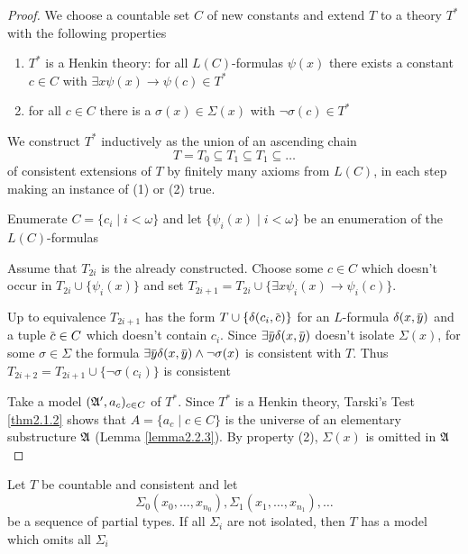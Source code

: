 \documentclass[11pt]{article}
\begin{document}
\begin{proof}
We choose a countable set \(C\) of new constants and extend \(T\) to a theory
\(T^*\) with the following properties
\begin{enumerate}
\item \(T^*\) is a Henkin theory: for all \(L(C)\)-formulas \(\psi(x)\) there
exists a constant \(c\in C\) with \(\exists x\psi(x)\to\psi(c)\in T^*\)
\item for all \(c\in C\) there is a \(\sigma(x)\in\Sigma(x)\) with \(\neg\sigma(c)\in
      T^*\)
\end{enumerate}


We construct \(T^*\) inductively as the union of an ascending chain
\begin{equation*}
T=T_0\subseteq T_1\subseteq T_1\subseteq\dots
\end{equation*}
of consistent extensions of \(T\) by finitely many axioms from \(L(C)\), in
each step making an instance of (1) or (2) true.

Enumerate \(C=\{c_i\mid i<\omega\}\) and let \(\{\psi_i(x)\mid i<\omega\}\)
be an enumeration of the \(L(C)\)-formulas

Assume that \(T_{2i}\) is the already constructed. Choose some \(c\in C\)
which doesn't occur in \(T_{2i}\cup\{\psi_i(x)\}\) and set
\(T_{2i+1}=T_{2i}\cup\{\exists x\psi_i(x)\to\psi_i(c)\}\).

Up to equivalence \(T_{2i+1}\) has the form \(T\cup\{\delta(c_i,\bbar{c})\}\) for
an \(L\)-formula \(\delta(x,\bbar{y})\) and a tuple \(\bbar{c}\in C\) which
doesn't contain \(c_i\). Since \(\exists\bbar{y}\delta(x,\bbar{y})\) doesn't
isolate \(\Sigma(x)\), for some \(\sigma\in\Sigma\) the formula
\(\exists\bbar{y}\delta(x,\bbar{y})\wedge\neg\sigma(x)\) is consistent with \(T\).
Thus \(T_{2i+2}=T_{2i+1}\cup\{\neg\sigma(c_i)\}\) is consistent

Take a model \((\mathfrak{A}',a_c)_{c\in C}\) of \(T^*\). Since \(T^*\) is a Henkin
theory, Tarski's Test \ref{thm2.1.2} shows that \(A=\{a_c\mid c\in C\}\) is the
universe of an elementary substructure \(\mathfrak{A}\) (Lemma \ref{lemma2.2.3}). By
property (2), \(\Sigma(x)\) is omitted in \(\mathfrak{A}\)
\end{proof}

\begin{corollary}[]
\label{cor4.1.3}
\label{ex4.1.1}
Let \(T\) be countable and consistent and let
\begin{equation*}
\Sigma_0(x_0,\dots,x_{n_0}),\Sigma_1(x_1,\dots,x_{n_1}),\dots
\end{equation*}
be a sequence of partial types. If all \(\Sigma_i\) are not isolated, then
\(T\) has a model which omits all \(\Sigma_i\)
\end{corollary}
\end{document}
